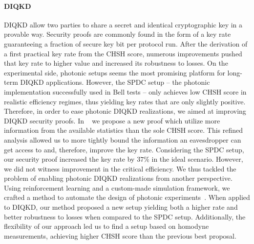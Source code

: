 \paragraph{DIQKD}

\acrfull{DIQKD} allow two parties to share a secret and identical cryptographic key in a provable way.
Security proofs are commonly found in the form of a key rate guaranteeing a fraction of secure key bit per protocol run.
After the derivation of a first practical key rate from the CHSH score, numerous improvements pushed that key rate to higher value and increased its robustness to losses.
On the experimental side, photonic setups seems the most promising platform for long-term DIQKD applications.
However, the SPDC setup -- the photonic implementation successfully used in Bell tests -- only achieves low CHSH score in realistic efficiency regimes, thus yielding key rates that are only slightly positive.
Therefore, in order to ease photonic DIQKD realizations, we aimed at improving DIQKD security proofs.
In ~\cite{Sekatski2021} we propose a new proof which utilize more information from the available statistics than the sole CHSH score.
This refined analysis allowed us to more tightly bound the information an eavesdropper can get access to and, therefore, improve the key rate.
Considering the SPDC setup, our security proof increased the key rate by $37\%$ in the ideal scenario.
However, we did not witness improvement in the critical efficiency.
We thus tackled the problem of enabling photonic DIQKD realizations from another perspective.
Using reinforcement learning and a custom-made simulation framework, we crafted a method to automate the design of photonic experiments~\cite{Valcarce2022b}.
When applied to DIQKD, our method proposed a new setup yielding both a higher rate and better robustness to losses when compared to the SPDC setup.
Additionally, the flexibility of our approach led us to find a setup based on homodyne measurements, achieving higher CHSH score than the previous best proposal.


